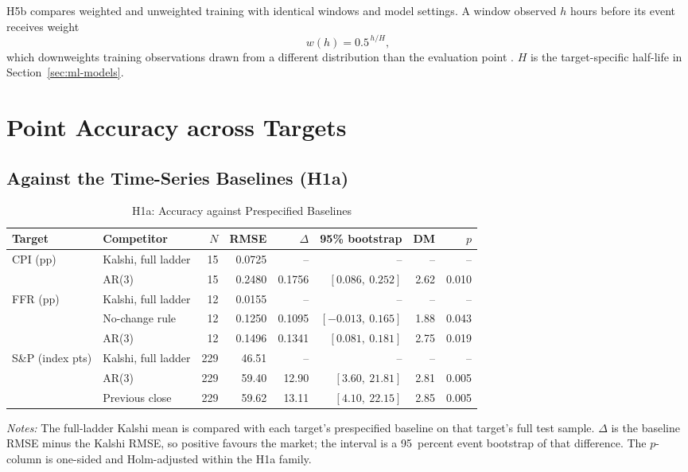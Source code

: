 \documentclass[12pt,a4paper]{report}
\newcommand{\tablenote}[1]{%
  \par\vspace{0.4em}%
  \begin{minipage}{0.9\textwidth}%
  \footnotesize\raggedright\emph{Notes:} #1%
  \end{minipage}%
}
\begin{document}
H5b compares weighted and unweighted training with identical windows and model
settings. A window observed $h$ hours before its event receives weight
\begin{equation}
w(h) = 0.5^{\,h/H},
\label{eq:weight}
\end{equation}
which downweights training observations drawn from a different distribution
than the evaluation point \parencite{shimodaira2000}. $H$ is the target-specific
half-life in Section~\ref{sec:ml-models}.

\section{Point Accuracy across Targets}
\label{sec:results-h1}

\subsection{Against the Time-Series Baselines (H1a)}
\label{sec:results-h1a}

\begin{table}[htbp]
\centering
\caption{H1a: Accuracy against Prespecified Baselines}
\label{tab:h1a}
\small
\begin{tabular}{@{}llrrrrrr@{}}
\toprule
Target & Competitor & $N$ & RMSE & $\Delta$ & 95\% bootstrap & DM & $p$ \\
\midrule
CPI (pp) & Kalshi, full ladder & 15 & 0.0725 & -- & -- & -- & -- \\
 & AR(3) & 15 & 0.2480 & 0.1756 & $[0.086,\ 0.252]$ & 2.62 & 0.010 \\
\midrule
FFR (pp) & Kalshi, full ladder & 12 & 0.0155 & -- & -- & -- & -- \\
 & No-change rule & 12 & 0.1250 & 0.1095 & $[-0.013,\ 0.165]$ & 1.88 & 0.043 \\
 & AR(3) & 12 & 0.1496 & 0.1341 & $[0.081,\ 0.181]$ & 2.75 & 0.019 \\
\midrule
S\&P (index pts) & Kalshi, full ladder & 229 & 46.51 & -- & -- & -- & -- \\
 & AR(3) & 229 & 59.40 & 12.90 & $[3.60,\ 21.81]$ & 2.81 & 0.005 \\
 & Previous close & 229 & 59.62 & 13.11 & $[4.10,\ 22.15]$ & 2.85 & 0.005 \\
\bottomrule
\end{tabular}
\tablenote{The full-ladder Kalshi mean is compared with each target's
prespecified baseline on that target's full test sample. $\Delta$ is the
baseline RMSE minus the Kalshi RMSE, so positive favours the market; the
interval is a 95~percent event bootstrap of that difference. The $p$-column
is one-sided and Holm-adjusted within the H1a family.}
\end{table}
\end{document}
